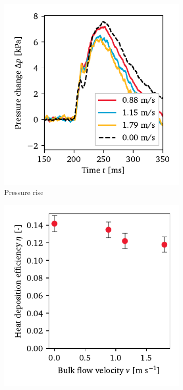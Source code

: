         \begin{figure}[h]
            \centering
            \begin{subfigure}[t]{0.47\textwidth}
                \centering
                \includegraphics[width=\textwidth]{assets/5 results/flow_deltap}
                \caption{Pressure rise}
                \label{fig:flow_pressure_rise}
            \end{subfigure}
            \hfill
            \begin{subfigure}[t]{0.47\textwidth}
                \centering
                \includegraphics[width=\textwidth]{assets/5 results/flow_eta}

\end{subfigure}
\end{figure}
